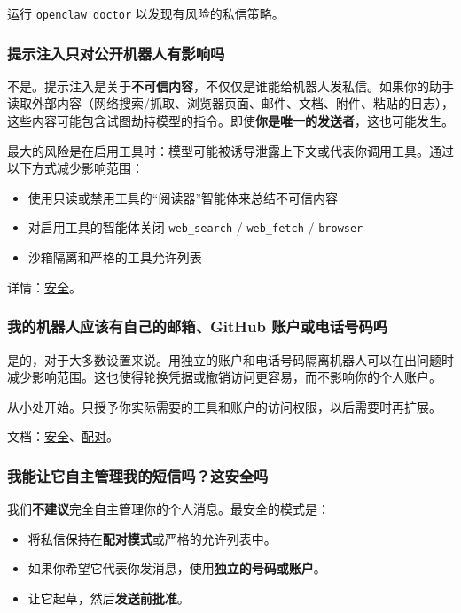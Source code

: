 运行 \texttt{openclaw doctor} 以发现有风险的私信策略。

\subsubsection{提示注入只对公开机器人有影响吗}


不是。提示注入是关于\textbf{不可信内容}，不仅仅是谁能给机器人发私信。如果你的助手读取外部内容（网络搜索/抓取、浏览器页面、邮件、文档、附件、粘贴的日志），这些内容可能包含试图劫持模型的指令。即使\textbf{你是唯一的发送者}，这也可能发生。

最大的风险是在启用工具时：模型可能被诱导泄露上下文或代表你调用工具。通过以下方式减少影响范围：

\begin{itemize}
  \item 使用只读或禁用工具的“阅读器”智能体来总结不可信内容
  \item 对启用工具的智能体关闭 \texttt{web\_search} / \texttt{web\_fetch} / \texttt{browser}
  \item 沙箱隔离和严格的工具允许列表
\end{itemize}


详情：\href{/gateway/security}{安全}。

\subsubsection{我的机器人应该有自己的邮箱、GitHub 账户或电话号码吗}


是的，对于大多数设置来说。用独立的账户和电话号码隔离机器人可以在出问题时减少影响范围。这也使得轮换凭据或撤销访问更容易，而不影响你的个人账户。

从小处开始。只授予你实际需要的工具和账户的访问权限，以后需要时再扩展。

文档：\href{/gateway/security}{安全}、\href{/channels/pairing}{配对}。

\subsubsection{我能让它自主管理我的短信吗？这安全吗}


我们\textbf{不建议}完全自主管理你的个人消息。最安全的模式是：

\begin{itemize}
  \item 将私信保持在\textbf{配对模式}或严格的允许列表中。
  \item 如果你希望它代表你发消息，使用\textbf{独立的号码或账户}。
  \item 让它起草，然后\textbf{发送前批准}。
\end{itemize}


